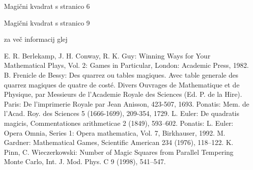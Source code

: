 \documentclass[a4paper,12pt]{article}
\begin{document}
Magični kvadrat s stranico 6

Magični kvadrat s stranico 9


za več informacij glej \cite{bessy}

\begin{thebibliography}{99}
E. R. Berlekamp, J. H. Conway, R. K. Guy:
Winning Ways for Your Mathematical Plays,
Vol. 2: Games in Particular, London: Academic Press, 1982.
B. Frenicle de Bessy:
Des quarrez ou tables magiques. Avec table generale des quarrez magiques de quatre de costé.
Divers Ouvrages de Mathematique et de Physique, par Messieurs de l'Academie Royale des Sciences (Ed. P. de la Hire).
Paris: De l'imprimerie Royale par Jean Anisson, 423-507, 1693.
Ponatis: Mem. de l'Acad. Roy. des Sciences 5 (1666-1699), 209-354, 1729.
L. Euler:
De quadratis magicis,
Commentationes arithmeticae 2 (1849), 593--602.
Ponatis: L. Euler: Opera Omnia, Series 1: Opera mathematica, Vol. 7, Birkhauser, 1992.
M. Gardner:
Mathematical Games,
Scientific American 234 (1976), 118--122.
K. Pinn, C. Wieczerkowski:
Number of Magic Squares from Parallel Tempering Monte Carlo,
Int. J. Mod. Phys. C 9 (1998), 541--547.
\end{thebibliography}
\end{document}
